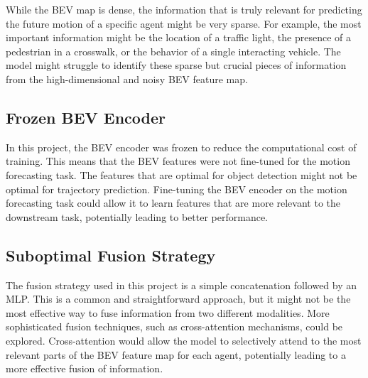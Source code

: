 While the BEV map is dense, the information that is truly relevant for predicting the future motion of a specific agent might be very sparse. For example, the most important information might be the location of a traffic light, the presence of a pedestrian in a crosswalk, or the behavior of a single interacting vehicle. The model might struggle to identify these sparse but crucial pieces of information from the high-dimensional and noisy BEV feature map.

\subsection{Frozen BEV Encoder}

In this project, the BEV encoder was frozen to reduce the computational cost of training. This means that the BEV features were not fine-tuned for the motion forecasting task. The features that are optimal for object detection might not be optimal for trajectory prediction. Fine-tuning the BEV encoder on the motion forecasting task could allow it to learn features that are more relevant to the downstream task, potentially leading to better performance.

\subsection{Suboptimal Fusion Strategy}

The fusion strategy used in this project is a simple concatenation followed by an MLP. This is a common and straightforward approach, but it might not be the most effective way to fuse information from two different modalities. More sophisticated fusion techniques, such as cross-attention mechanisms, could be explored. Cross-attention would allow the model to selectively attend to the most relevant parts of the BEV feature map for each agent, potentially leading to a more effective fusion of information.
